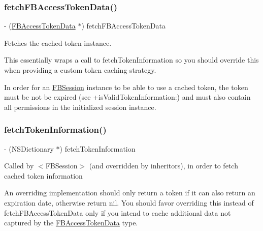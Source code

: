 \subsubsection{\texorpdfstring{fetch\+F\+B\+Access\+Token\+Data()}{fetchFBAccessTokenData()}\hspace{0.1cm}{\footnotesize\ttfamily [5/5]}}
{\footnotesize\ttfamily -\/ (\hyperlink{interfaceFBAccessTokenData}{F\+B\+Access\+Token\+Data} $\ast$) fetch\+F\+B\+Access\+Token\+Data \begin{DoxyParamCaption}{ }\end{DoxyParamCaption}}

Fetches the cached token instance.

This essentially wraps a call to {\ttfamily fetch\+Token\+Information} so you should override this when providing a custom token caching strategy.

In order for an {\ttfamily \hyperlink{interfaceFBSession}{F\+B\+Session}} instance to be able to use a cached token, the token must be not be expired (see {\ttfamily +is\+Valid\+Token\+Information\+:}) and must also contain all permissions in the initialized session instance. \mbox{\label{interfaceFBSessionTokenCachingStrategy_a08b75ac08ae3b7a1ad769f3b026f857c}} 
\subsubsection{\texorpdfstring{fetch\+Token\+Information()}{fetchTokenInformation()}\hspace{0.1cm}{\footnotesize\ttfamily [1/5]}}
{\footnotesize\ttfamily -\/ (N\+S\+Dictionary $\ast$) fetch\+Token\+Information \begin{DoxyParamCaption}{ }\end{DoxyParamCaption}}

Called by $<$\+F\+B\+Session$>$ (and overridden by inheritors), in order to fetch cached token information

An overriding implementation should only return a token if it can also return an expiration date, otherwise return nil. You should favor overriding this instead of {\ttfamily fetch\+F\+B\+Access\+Token\+Data} only if you intend to cache additional data not captured by the \hyperlink{interfaceFBAccessTokenData}{F\+B\+Access\+Token\+Data} type. \mbox{\label{interfaceFBSessionTokenCachingStrategy_a08b75ac08ae3b7a1ad769f3b026f857c}} 

